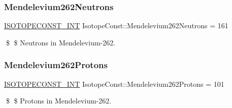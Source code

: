 \subsubsection{\texorpdfstring{Mendelevium262\+Neutrons}{Mendelevium262Neutrons}}
{\footnotesize\ttfamily \mbox{\hyperlink{group___isotope_const-_macros_ga5f18360b3e99483a35c32d789e62621c}{I\+S\+O\+T\+O\+P\+E\+C\+O\+N\+S\+T\+\_\+\+I\+NT}} Isotope\+Const\+::\+Mendelevium262\+Neutrons = 161}

\$ \$ Neutrons in Mendelevium-\/262. \mbox{\label{group___isotope_const-_mendelevium-_md262_gae2b427a849074d85a421223cb0118d00}} 
\subsubsection{\texorpdfstring{Mendelevium262\+Protons}{Mendelevium262Protons}}
{\footnotesize\ttfamily \mbox{\hyperlink{group___isotope_const-_macros_ga5f18360b3e99483a35c32d789e62621c}{I\+S\+O\+T\+O\+P\+E\+C\+O\+N\+S\+T\+\_\+\+I\+NT}} Isotope\+Const\+::\+Mendelevium262\+Protons = 101}

\$ \$ Protons in Mendelevium-\/262. 